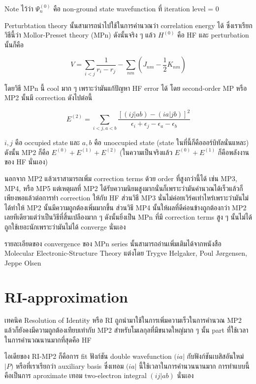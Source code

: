 Note ไว้ว่า $\Psi^{(0)}_{n}$ คือ non-ground state wavefunction ที่ iteration level = 0

Perturbtation theory นั้นสามารถนำไปใช้ในการคำนวณว่า correlation energy ได้ ซึ่งเราเรียกวิธีนี้ว่า
Mollor-Presset theory (MPn) ดังนั้นจริง ๆ แล้ว $H^{(0)}$ คือ HF และ perturbation นั้นก็คือ

\begin{equation}
    V = \sum_{i < j} \frac{1}{r_{i} - r_{j}} - \sum_{nm} (J_{nm} - \frac{1}{2}K_{nm})
\end{equation}

โดยวิธี MPn นี้ cool มาก ๆ เพราะว่ามันแก้ปัญหา HF error ได้ โดย second-order MP หรือ MP2 นั้นมี
correction ดังไปต่อนี้

\begin{equation}
    E^{(2)} = \sum_{i<j,a<b} \frac{[(ij|ab) - (ia|jb)]^{2}}
    {\epsilon_{i} + \epsilon_{j} - \epsilon_{a} - \epsilon_{b}}
\end{equation}

\noindent $i,j$ คือ occupied state และ $a,b$ คือ unoccupied state (state ในที่นี้ก็คือออร์บิทัลนั่นแหละ)
ดังนั้น MP2 ก็คือ $E^{(0)} + E^{(1)} + E^{(2)}$ (ในความเป็นจริงแล้ว $E^{(0)} + E^{(1)}$ ก็คือพลังงานของ
HF นั่นเอง)

นอกจาก MP2 แล้วเราสามารถเพิ่ม correction terms ด้วย order ที่สูงกว่านี้ได้ เช่น MP3, MP4, หรือ MP5
แต่เหตุผลที่ MP2 ได้รับความนิยมสูงมากนั่นก็เพราะว่ามันคำนวณได้เร็วแล้วก็เพียงพอแล้วต่อการทำ correction
ให้กับ HF ส่วนวิธี MP3 นั่นไม่ค่อยเวิร์คเท่าไหร่เพราะว่ามันไม่ได้ทำให้ MP2 นั้นมีความถูกต้องเพิ่มมากขึ้น ส่วนวิธี MP4
นั้นให้ผลที่ดีค่อนข้างถูกต้องกว่า MP2 เลยทีเดียวแต่ว่าเป็นวิธีที่สิ้นเปลืองมาก ๆ ดังนั้นยิ่งเป็น MPn ที่มี correction terms
สูง ๆ นั้นไม่ได้ถูกใช้เยอะนักเพราะว่ามันไม่ได้ converge นั่นเอง

รายละเอียดของ convergence ของ MPn series นั้นสามารถอ่านเพิ่มเติมได้จากหนังสือ
Molecular Electronic-Structure Theory แต่งโดย Trygve Helgaker, Poul Jørgensen, Jeppe Olsen

\section{RI-approximation}

เทคนิค Resolution of Identity หรือ RI ถูกนำมาใช้ในการเพิ่มความเร็วในการคำนวณ MP2
แล้วก็ยังคงมีความถูกต้องเทียบเท่ากับ MP2 สำหรับโมเลกุลที่มีขนาดใหญ่มาก ๆ นั้น part ที่ใช้เวลาในการคำนวณนานมากที่สุดคือ
HF

ไอเดียของ RI-MP2 ก็คือการ fit ฟังก์ชัน double wavefunction $(ia|$ กับฟังก์ชันเบสิสอันใหม่ $|P)$ หรือที่เราเรียกว่า
auxiliary basis ซึ่งเทอม $(ia|$ นี้ใช้เวลาในการคำนวนนานมาก การทำแบบนี้คือเป็นการ aproximate เทอม
two-electron integral $(ij|ab)$ นั่นเอง

